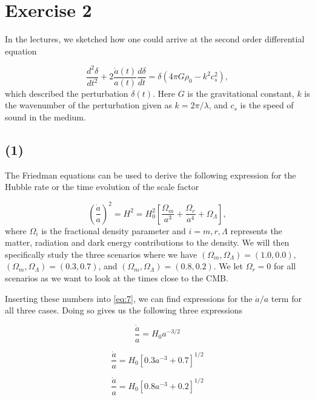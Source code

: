 \documentclass[a4paper]{article}
\begin{document}
\section*{Exercise 2}
In the lectures, we sketched how one could arrive at the second order differential equation 

\begin{equation}
\frac{d^2 \delta}{dt^2} + 2 \frac{\dot{a}(t)}{a(t)} \frac{d \delta}{dt} = \delta(4 \pi G \rho_0 - k^2 c_s^2),
\end{equation}
which described the perturbation $\delta(t)$. Here $G$ is the gravitational constant, $k$ is the wavenumber of the perturbation given as $k = 2\pi/ \lambda$, and $c_s$ is the speed of sound in the medium.
\subsection*{(1)}

The Friedman equations can be used to derive the following expression for the Hubble rate or the time evolution of the scale factor 

\begin{equation}
\left(\frac{\dot{a}}{a}\right)^2 = H^2 = H_0^2 \left[ \frac{\Omega_m}{a^3} + \frac{\Omega_r}{a^4} + \Omega_\Lambda \right],
\end{equation}
where $\Omega_i$ is the fractional density parameter and
$i = m,r, \Lambda$ represents the matter, radiation and dark energy contributions to the density. We will then specifically study the three scenarios where we have  $(\Omega_m, \Omega_\Lambda) = (1.0, 0.0)$, $(\Omega_m, \Omega_\Lambda) = (0.3, 0.7)$, and $(\Omega_m, \Omega_\Lambda) = (0.8, 0.2)$. We let $\Omega_r = 0$ for all scenarios as we want to look at the times close to the CMB.

Inserting these numbers into \eqref{eq:7}, we can find expressions for the $\dot{a}/a$ term for all three cases. Doing so gives us the following three expressions

\begin{equation}
\frac{\dot{a}}{a} = H_0 a^{-3/2}
\end{equation}

\begin{equation}
\frac{\dot{a}}{a} = H_0 \left[0.3a^{-3} + 0.7\right]^{1/2}
\end{equation}

\begin{equation}
\frac{\dot{a}}{a} = H_0  \left[0.8a^{-3} + 0.2\right]^{1/2}
\end{equation}
\end{document}
